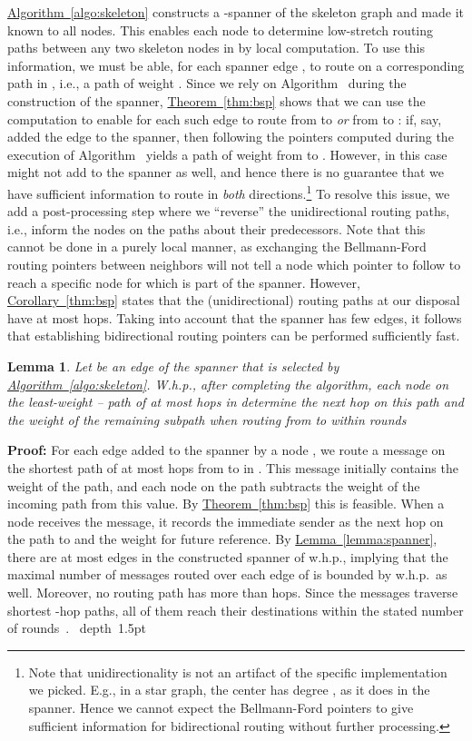 \documentclass[letterpaper,11pt]{article}
\newcommand{\namedref}[2]{\hyperref[#2]{#1~\ref*{#2}}}
\newcommand{\theoremref}[1]{\namedref{Theorem}{#1}}
\newcommand{\lemmaref}[1]{\namedref{Lemma}{#1}}
\newcommand{\corollaryref}[1]{\namedref{Corollary}{#1}}
\newcommand{\algref}[1]{\namedref{Algorithm}{#1}}
\newtheorem{lemma}[theorem]{Lemma}
\newcommand{\blackslug}{\hbox{\hskip 1pt \vrule width 4pt height 8pt
depth 1.5pt \hskip 1pt}}
\newcommand{\QED}{\quad\blackslug\lower 8.5pt\null\par}
\newenvironment{proof}[1][Proof:]{\noindent \textbf{#1}\xspace}{\QED}
\begin{document}
\algref{algo:skeleton} constructs a -spanner of the skeleton graph and
made it known to all nodes. This enables each node to determine low-stretch
routing paths between any two skeleton nodes in  by local
computation. To use this information, we must be able, for each spanner edge
, to route on a corresponding path in , i.e., a path
of weight . Since we rely on Algorithm~ during the
construction of the spanner, \theoremref{thm:bsp} shows that we can use the
computation to enable for each such edge to route from  to  \emph{or} from
 to : if, say,  added the edge to the spanner, then following the
pointers computed during the execution of Algorithm~ yields a path of
weight  from  to . However, in this case   might not
add  to the spanner as well, and hence there is no guarantee that we
have sufficient information to route in \emph{both} directions.\footnote{Note
that unidirectionality is not an artifact of the specific implementation we
picked. E.g., in a star graph, the center has degree , as it does in the
spanner. Hence we cannot expect the Bellmann-Ford pointers to give sufficient
information for bidirectional routing without further processing.} To resolve
this issue, we add a post-processing step where we ``reverse'' the
unidirectional routing paths, i.e., inform the nodes on the paths about their
predecessors. Note that this cannot be done in a purely local manner, as
exchanging the Bellmann-Ford routing pointers between neighbors will not tell a
node  which pointer to follow to reach a specific node  for
which  is part of the spanner. However, \corollaryref{thm:bsp} states
that the (unidirectional) routing paths at our disposal have at most 
hops. Taking into account that the spanner has few edges, it follows that
establishing bidirectional routing pointers can be performed sufficiently fast.

\begin{lemma}\label{lemma:spanner_routing}
Let  be an edge of the spanner  that is selected by
\algref{algo:skeleton}.  W.h.p., after completing the algorithm, 
each node 
on the least-weight -- path of at most  hops in   determine
the next hop on this path and the weight of the remaining subpath when routing
from  to  within  rounds
\end{lemma}
\begin{proof}
For each edge  added to the spanner by a node , we route a message
on the shortest path of at most  hops from  to  in . This
message initially contains the weight of the path, and each node on the path
subtracts the weight of the incoming path from this value. By
\theoremref{thm:bsp} this is feasible. When a node receives the message, it
records the immediate sender as the next hop on the path to  and the weight
for future reference. By \lemmaref{lemma:spanner}, there are at most
 edges in the constructed spanner of 
w.h.p., implying that the maximal number of messages routed over each edge of
 is bounded by  w.h.p.\ as well. Moreover, no
routing path has more than  hops. Since the
messages traverse shortest -hop paths, all of them reach their destinations
within the stated number of rounds~\cite{MP-91}.
\end{proof}
\end{document}
